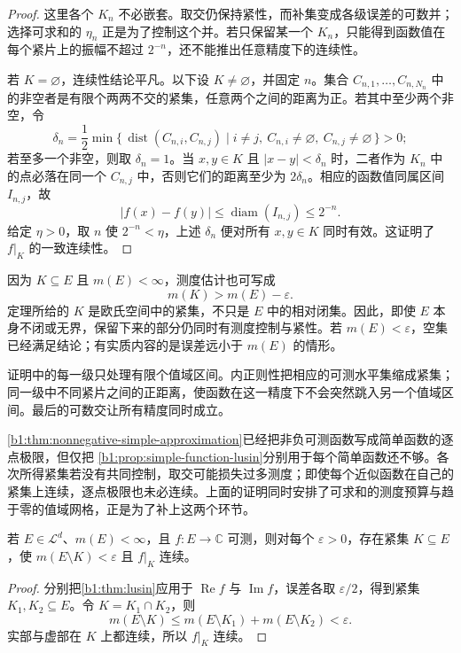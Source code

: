 \begin{proof}
这里各个 \(K_n\) 不必嵌套。取交仍保持紧性，而补集变成各级误差的可数并；选择可求和的 \(\eta_n\) 正是为了控制这个并。若只保留某一个 \(K_n\)，只能得到函数值在每个紧片上的振幅不超过 \(2^{-n}\)，还不能推出任意精度下的连续性。

若 \(K=\varnothing\)，连续性结论平凡。以下设 \(K\ne\varnothing\)，并固定 \(n\)。集合
\(C_{n,1},\ldots,C_{n,N_n}\) 中的非空者是有限个两两不交的紧集，任意两个之间的距离为正。若其中至少两个非空，令
\[
\delta_n
=\frac12\min\{\,\operatorname{dist}(C_{n,i},C_{n,j})\mid
  i\ne j,\ C_{n,i}\ne\varnothing,\ C_{n,j}\ne\varnothing\,\}>0;
\]
若至多一个非空，则取 \(\delta_n=1\)。当 \(x,y\in K\) 且
\(|x-y|<\delta_n\) 时，二者作为 \(K_n\) 中的点必落在同一个
\(C_{n,j}\) 中，否则它们的距离至少为 \(2\delta_n\)。相应的函数值同属区间 \(I_{n,j}\)，故
\[
|f(x)-f(y)|
\leq\operatorname{diam}(I_{n,j})
\leq2^{-n}.
\]
给定 \(\eta>0\)，取 \(n\) 使 \(2^{-n}<\eta\)，上述 \(\delta_n\) 便对所有 \(x,y\in K\) 同时有效。这证明了 \(f|_K\) 的一致连续性。
\end{proof}

因为 \(K\subseteq E\) 且 \(m(E)<\infty\)，测度估计也可写成
\[
m(K)>m(E)-\varepsilon.
\]
定理所给的 \(K\) 是欧氏空间中的紧集，不只是 \(E\) 中的相对闭集。因此，即使
\(E\) 本身不闭或无界，保留下来的部分仍同时有测度控制与紧性。若
\(m(E)<\varepsilon\)，空集已经满足结论；有实质内容的是误差远小于
\(m(E)\) 的情形。

\ProseParagraphBreak

证明中的每一级只处理有限个值域区间。内正则性把相应的可测水平集缩成紧集；同一级中不同紧片之间的正距离，使函数在这一精度下不会突然跳入另一个值域区间。最后的可数交让所有精度同时成立。%

\ProseParagraphBreak

\cref{b1:thm:nonnegative-simple-approximation}已经把非负可测函数写成简单函数的逐点极限，但仅把%
\cref{b1:prop:simple-function-lusin}分别用于每个简单函数还不够。各次所得紧集若没有共同控制，取交可能损失过多测度；即使每个近似函数在自己的紧集上连续，逐点极限也未必连续。上面的证明同时安排了可求和的测度预算与趋于零的值域网格，正是为了补上这两个环节。

\begin{corollary}
\label{b1:cor:lusin-complex}
若 \(E\in\mathcal L^d\)、\(m(E)<\infty\)，且 \(f:E\rightarrow\mathbb C\) 可测，则对每个 \(\varepsilon>0\)，存在紧集 \(K\subseteq E\)，使
\(m(E\setminus K)<\varepsilon\) 且 \(f|_K\) 连续。
\end{corollary}
\begin{proof}
分别把\cref{b1:thm:lusin}应用于 \(\operatorname{Re}f\) 与
\(\operatorname{Im}f\)，误差各取 \(\varepsilon/2\)，得到紧集
\(K_1,K_2\subseteq E\)。令 \(K=K_1\cap K_2\)，则
\[
m(E\setminus K)
\leq m(E\setminus K_1)+m(E\setminus K_2)
<\varepsilon.
\]
实部与虚部在 \(K\) 上都连续，所以 \(f|_K\) 连续。
\end{proof}

